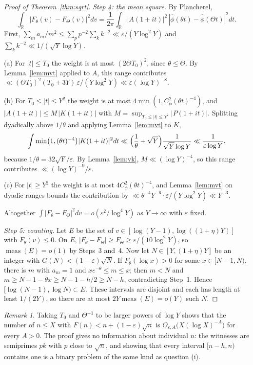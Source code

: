 \documentclass[11pt,letterpaper]{article}
\theoremstyle{remark}
\newtheorem{remark}[theorem]{Remark}
\begin{document}
\begin{proof}[Proof of Theorem~\ref{thm:sqrt}]
\emph{Step 4: the mean square.} By Plancherel,
\[
\int_{\mathbb R}|F_\theta(v)-F_\Theta(v)|^2dv=\frac1{2\pi}\int_{\mathbb R}|A(1+it)|^2\,|\hat\phi(\theta t)-\hat\phi(\Theta t)|^2dt.
\]
First, $\sum_ma_m/m^2\le\sum_pp^{-2}\sum_kk^{-2}\ll\varepsilon/(Y\log^2Y)$ and
$\sum_kk^{-2}\ll1/(\sqrt Y\log Y)$.

(a) For $|t|\le T_0$ the weight is at most $(2\Theta T_0)^2$, since
$\theta\le\Theta$. By Lemma~\ref{lem:mvt} applied to $A$, this range contributes
$\ll(\Theta T_0)^2(T_0+3Y)\,\varepsilon/(Y\log^2Y)\ll\varepsilon(\log Y)^{-8}$.

(b) For $T_0\le|t|\le Y^2$ the weight is at most $4\min(1,C_\phi^2(\theta t)^{-4})$,
and $|A(1+it)|\le M\,|K(1+it)|$ with $M=\sup_{T_0\le|t|\le Y^2}|P(1+it)|$.
Splitting dyadically above $1/\theta$ and applying Lemma~\ref{lem:mvt} to $K$,
\[
\int\min\bigl(1,(\theta t)^{-4}\bigr)|K(1+it)|^2dt\ll\Bigl(\frac1\theta+\sqrt Y\Bigr)\frac{1}{\sqrt Y\log Y}\ll\frac{1}{\varepsilon\log Y},
\]
because $1/\theta=32\sqrt Y/\varepsilon$. By Lemma~\ref{lem:vk},
$M\ll(\log Y)^{-4}$, so this range contributes $\ll(\log Y)^{-9}/\varepsilon$.

(c) For $|t|\ge Y^2$ the weight is at most $4C_\phi^2(\theta t)^{-4}$, and
Lemma~\ref{lem:mvt} on dyadic ranges bounds the contribution by
$\ll\theta^{-4}Y^{-6}\cdot\varepsilon/(Y\log^2Y)\ll Y^{-3}$.

Altogether $\int|F_\theta-F_\Theta|^2dv=o(\varepsilon^2/\log^4Y)$ as
$Y\to\infty$ with $\varepsilon$ fixed.

\emph{Step 5: counting.} Let $E$ be the set of
$v\in[\log(Y-1),\log((1+\eta)Y)]$ with $F_\theta(v)\le0$. On $E$,
$|F_\theta-F_\Theta|\ge F_\Theta\ge\varepsilon/(10\log^2Y)$, so
$\operatorname{meas}(E)=o(1)$ by Steps~3 and~4. Now let $N\in[Y,(1+\eta)Y]$ be
an integer with $G(N)<(1-\varepsilon)\sqrt N$. If $F_\theta(\log x)>0$ for some
$x\in[N-1,N)$, there is $m$ with $a_m=1$ and $xe^{-\theta}\le m\le x$; then
$m<N$ and $m\ge N-1-\theta x\ge N-1-h/2\ge N-h$, contradicting Step~1. Hence
$[\log(N-1),\log N)\subset E$. These intervals are disjoint and each has
length at least $1/(2Y)$, so there are at most $2Y\operatorname{meas}(E)=o(Y)$
such $N$.
\end{proof}

\begin{remark}
Taking $T_0$ and $\Theta^{-1}$ to be larger powers of $\log Y$ shows that the
number of $n\le X$ with $F(n)<n+(1-\varepsilon)\sqrt n$ is
$O_{\varepsilon,A}\bigl(X(\log X)^{-A}\bigr)$ for every $A>0$. The proof gives no
information about individual $n$: the witnesses are semiprimes $pk$ with $p$
close to $\sqrt n$, and showing that every interval $[n-h,n)$ contains one is a
binary problem of the same kind as question (i).
\end{remark}
\end{document}
